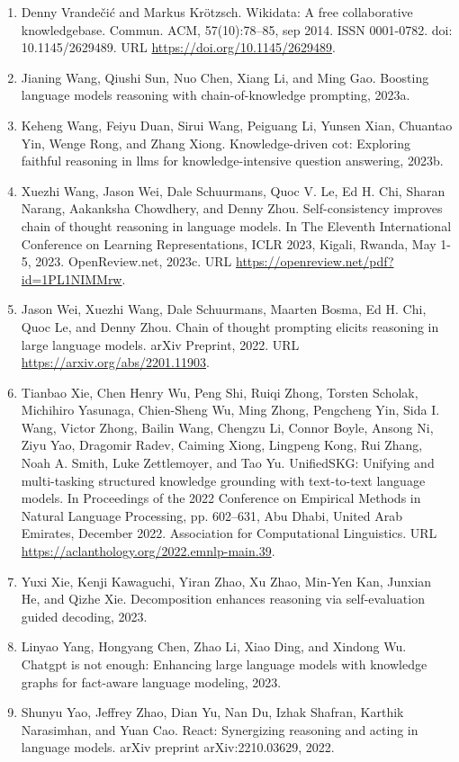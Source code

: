 \documentclass[11pt,UTF8,fontset=fandol]{ctexart}
\begin{document}
\begin{enumerate}[leftmargin=2em]
\item Denny Vrande\v{c}i\'{c} and Markus Kr\"{o}tzsch. Wikidata: A free collaborative knowledgebase. Commun. ACM, 57(10):78--85, sep 2014. ISSN 0001-0782. doi: 10.1145/2629489. URL \url{https://doi.org/10.1145/2629489}.
\item Jianing Wang, Qiushi Sun, Nuo Chen, Xiang Li, and Ming Gao. Boosting language models reasoning with chain-of-knowledge prompting, 2023a.
\item Keheng Wang, Feiyu Duan, Sirui Wang, Peiguang Li, Yunsen Xian, Chuantao Yin, Wenge Rong, and Zhang Xiong. Knowledge-driven cot: Exploring faithful reasoning in llms for knowledge-intensive question answering, 2023b.
\item Xuezhi Wang, Jason Wei, Dale Schuurmans, Quoc V. Le, Ed H. Chi, Sharan Narang, Aakanksha Chowdhery, and Denny Zhou. Self-consistency improves chain of thought reasoning in language models. In The Eleventh International Conference on Learning Representations, ICLR 2023, Kigali, Rwanda, May 1-5, 2023. OpenReview.net, 2023c. URL \url{https://openreview.net/pdf?id=1PL1NIMMrw}.
\item Jason Wei, Xuezhi Wang, Dale Schuurmans, Maarten Bosma, Ed H. Chi, Quoc Le, and Denny Zhou. Chain of thought prompting elicits reasoning in large language models. arXiv Preprint, 2022. URL \url{https://arxiv.org/abs/2201.11903}.
\item Tianbao Xie, Chen Henry Wu, Peng Shi, Ruiqi Zhong, Torsten Scholak, Michihiro Yasunaga, Chien-Sheng Wu, Ming Zhong, Pengcheng Yin, Sida I. Wang, Victor Zhong, Bailin Wang, Chengzu Li, Connor Boyle, Ansong Ni, Ziyu Yao, Dragomir Radev, Caiming Xiong, Lingpeng Kong, Rui Zhang, Noah A. Smith, Luke Zettlemoyer, and Tao Yu. UnifiedSKG: Unifying and multi-tasking structured knowledge grounding with text-to-text language models. In Proceedings of the 2022 Conference on Empirical Methods in Natural Language Processing, pp. 602--631, Abu Dhabi, United Arab Emirates, December 2022. Association for Computational Linguistics. URL \url{https://aclanthology.org/2022.emnlp-main.39}.
\item Yuxi Xie, Kenji Kawaguchi, Yiran Zhao, Xu Zhao, Min-Yen Kan, Junxian He, and Qizhe Xie. Decomposition enhances reasoning via self-evaluation guided decoding, 2023.
\item Linyao Yang, Hongyang Chen, Zhao Li, Xiao Ding, and Xindong Wu. Chatgpt is not enough: Enhancing large language models with knowledge graphs for fact-aware language modeling, 2023.
\item Shunyu Yao, Jeffrey Zhao, Dian Yu, Nan Du, Izhak Shafran, Karthik Narasimhan, and Yuan Cao. React: Synergizing reasoning and acting in language models. arXiv preprint arXiv:2210.03629, 2022.

\end{enumerate}
\end{document}
